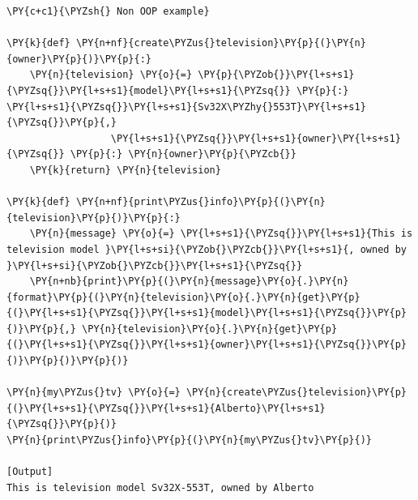 \begin{Verbatim}[label=\makebox{\url{https://github.com/lucabaldini/cmepda/tree/master/slides/latex/snippets/non\_oop\_example.py}},commandchars=\\\{\}]
\PY{c+c1}{\PYZsh{} Non OOP example}

\PY{k}{def} \PY{n+nf}{create\PYZus{}television}\PY{p}{(}\PY{n}{owner}\PY{p}{)}\PY{p}{:}
    \PY{n}{television} \PY{o}{=} \PY{p}{\PYZob{}}\PY{l+s+s1}{\PYZsq{}}\PY{l+s+s1}{model}\PY{l+s+s1}{\PYZsq{}} \PY{p}{:} \PY{l+s+s1}{\PYZsq{}}\PY{l+s+s1}{Sv32X\PYZhy{}553T}\PY{l+s+s1}{\PYZsq{}}\PY{p}{,}
                  \PY{l+s+s1}{\PYZsq{}}\PY{l+s+s1}{owner}\PY{l+s+s1}{\PYZsq{}} \PY{p}{:} \PY{n}{owner}\PY{p}{\PYZcb{}}
    \PY{k}{return} \PY{n}{television}
                  
\PY{k}{def} \PY{n+nf}{print\PYZus{}info}\PY{p}{(}\PY{n}{television}\PY{p}{)}\PY{p}{:}
    \PY{n}{message} \PY{o}{=} \PY{l+s+s1}{\PYZsq{}}\PY{l+s+s1}{This is television model }\PY{l+s+si}{\PYZob{}\PYZcb{}}\PY{l+s+s1}{, owned by }\PY{l+s+si}{\PYZob{}\PYZcb{}}\PY{l+s+s1}{\PYZsq{}}
    \PY{n+nb}{print}\PY{p}{(}\PY{n}{message}\PY{o}{.}\PY{n}{format}\PY{p}{(}\PY{n}{television}\PY{o}{.}\PY{n}{get}\PY{p}{(}\PY{l+s+s1}{\PYZsq{}}\PY{l+s+s1}{model}\PY{l+s+s1}{\PYZsq{}}\PY{p}{)}\PY{p}{,} \PY{n}{television}\PY{o}{.}\PY{n}{get}\PY{p}{(}\PY{l+s+s1}{\PYZsq{}}\PY{l+s+s1}{owner}\PY{l+s+s1}{\PYZsq{}}\PY{p}{)}\PY{p}{)}\PY{p}{)}

\PY{n}{my\PYZus{}tv} \PY{o}{=} \PY{n}{create\PYZus{}television}\PY{p}{(}\PY{l+s+s1}{\PYZsq{}}\PY{l+s+s1}{Alberto}\PY{l+s+s1}{\PYZsq{}}\PY{p}{)}
\PY{n}{print\PYZus{}info}\PY{p}{(}\PY{n}{my\PYZus{}tv}\PY{p}{)}

[Output]
This is television model Sv32X-553T, owned by Alberto
\end{Verbatim}
